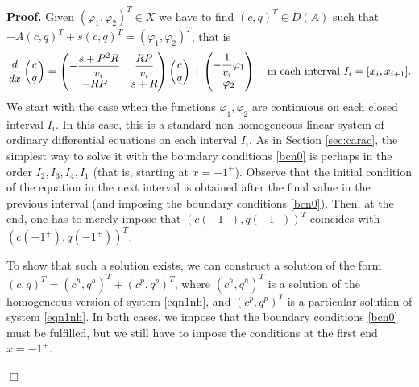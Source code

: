 \documentclass[a4paper]{article}
\numberwithin{equation}{section}
\newenvironment{pf}{\vspace{0.5em}\noindent\textbf{Proof.} }{\quad \hfill $\Box$ \\ \vspace{0.2em}\\}
\begin{document}
\begin{pf}
Given $(\varphi_1,\varphi_2)^T\in X$ we have to find $(c,q)^T\in D(A)$ such that $-A(c,q)^T+s(c,q)^T=(\varphi_1,\varphi_2)^T$, that is
\begin{equation}\label{eqn1nh}
\dfrac{d}{dx}
\begin{pmatrix}
c\\q
\end{pmatrix}
=
\begin{pmatrix}
-\dfrac{s+P^2R}{v_i}&\dfrac{RP}{v_i}\\-RP&s+R
\end{pmatrix}
\begin{pmatrix}
c\\q
\end{pmatrix}+\begin{pmatrix}-\dfrac{1}{v_i}\varphi_1\\ \varphi_2\end{pmatrix} \hspace{0.25cm} \textrm{      in each interval $I_i=[x_i,x_{i+1}]$} .
\end{equation}
We start with the case when the functions $\varphi_1,\varphi_2$ are continuous on each closed interval $I_i$. In this case, this is a standard non-homogeneous linear system of ordinary differential equations on each interval $I_i$. As in Section \ref{sec:carac}, the simplest way to solve it with the boundary conditions \eqref{bcn0} is perhaps in the order $I_2,I_3,I_4, I_1$ (that is, starting at $x=-1^+$). Observe that the initial condition of the equation in the next interval is obtained after the final value in the previous interval (and imposing the boundary conditions \eqref{bcn0}). Then, at the end, one has to merely impose that $(c(-1^-),q(-1^-))^T$ coincides with $(c(-1^+),q(-1^+))^T$.

To show that such a solution exists, we can construct a solution of the form $(c,q)^T = (c^h,q^h)^T + (c^p,q^p)^T  $, where $(c^h,q^h)^T$ is a solution of the homogeneous version of system \eqref{eqn1nh}, and $(c^p,q^p)^T$ is a particular solution of system \eqref{eqn1nh}. In both cases, we impose that the boundary conditions \eqref{bcn0} must be fulfilled, but we still have to impose the conditions at the first end $x=-1^+$.


\end{pf}
\end{document}

